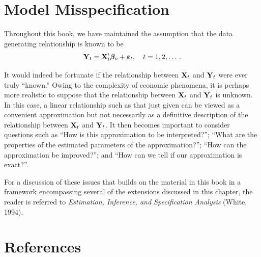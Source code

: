 \section{Model Misspecification}\label{sec:model-misspecification}

Throughout this book, we have maintained the assumption that the data
generating relationship is known to be
%
\[
  \mathbf{Y}_t = \mathbf{X}_t'\boldsymbol{\beta}_o + \boldsymbol{\varepsilon}_t, \quad t = 1, 2, \ldots\,.
\]

It would indeed be fortunate if the relationship between $\mathbf{X}_t$ and $\mathbf{Y}_t$ were
ever truly ``known.'' Owing to the complexity of economic phenomena, it is
perhaps more realistic to suppose that the relationship between $\mathbf{X}_t$ and $\mathbf{Y}_t$
is unknown. In this case, a linear relationship such as that just given can
be viewed as a convenient approximation but not necessarily as a definitive description of the relationship between $\mathbf{X}_t$ and $\mathbf{Y}_t$. It then becomes
important to consider questions such as ``How is this approximation to be
interpreted?''; ``What are the properties of the estimated parameters of the
approximation?''; ``How can the approximation be improved?''; and ``How
can we tell if our approximation is exact?''.

For a discussion of these issues that builds on the material in this book
in a framework encompassing several of the extensions discussed in this
chapter, the reader is referred to \emph{Estimation, Inference, and Specification
Analysis} (White, 1994).

\section*{References}

